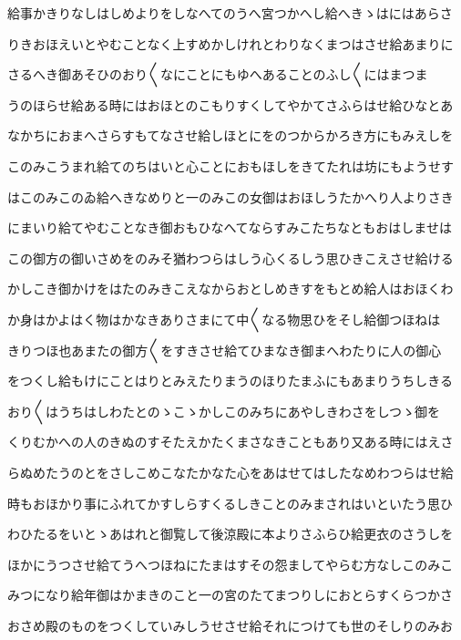 \documentclass[a4paper,11pt,landscape]{ltjtarticle}
\begin{document}
\par\medskip
給事かきりなしはしめよりをしなへてのうへ宮つかへし給へきゝはにはあらさ
\par\medskip
りきおほえいとやむことなく上すめかしけれとわりなくまつはさせ給あまりに
\par\medskip
さるへき御あそひのおり〱なにことにもゆへあることのふし〱にはまつま
\par\medskip
うのほらせ給ある時にはおほとのこもりすくしてやかてさふらはせ給ひなとあ
\par\medskip
なかちにおまへさらすもてなさせ給しほとにをのつからかろき方にもみえしを
\par\medskip
このみこうまれ給てのちはいと心ことにおもほしをきてたれは坊にもようせす
\par\medskip
はこのみこのゐ給へきなめりと一のみこの女御はおほしうたかへり人よりさき
\par\medskip
にまいり給てやむことなき御おもひなへてならすみこたちなともおはしませは
\par\medskip
この御方の御いさめをのみそ猶わつらはしう心くるしう思ひきこえさせ給ける
\par\medskip
かしこき御かけをはたのみきこえなからおとしめきすをもとめ給人はおほくわ
\par\medskip
か身はかよはく物はかなきありさまにて中〱なる物思ひをそし給御つほねは
\par\medskip
きりつほ也あまたの御方〱をすきさせ給てひまなき御まへわたりに人の御心
\par\medskip
をつくし給もけにことはりとみえたりまうのほりたまふにもあまりうちしきる
\par\medskip
おり〱はうちはしわたとのゝこゝかしこのみちにあやしきわさをしつゝ御を
\par\medskip
くりむかへの人のきぬのすそたえかたくまさなきこともあり又ある時にはえさ
\par\medskip
らぬめたうのとをさしこめこなたかなた心をあはせてはしたなめわつらはせ給
\par\medskip
時もおほかり事にふれてかすしらすくるしきことのみまされはいといたう思ひ
\par\medskip
わひたるをいとゝあはれと御覧して後涼殿に本よりさふらひ給更衣のさうしを
\par\medskip
ほかにうつさせ給てうへつほねにたまはすその怨ましてやらむ方なしこのみこ
\par\medskip
みつになり給年御はかまきのこと一の宮のたてまつりしにおとらすくらつかさ
\par\medskip
おさめ殿のものをつくしていみしうせさせ給それにつけても世のそしりのみお
\par\medskip
\end{document}
